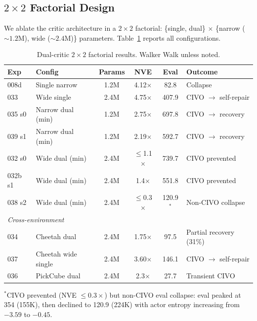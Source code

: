 \subsection{\texorpdfstring{$2{\times}2$}{2x2} Factorial Design}

We ablate the critic architecture in a $2{\times}2$ factorial: \{single, dual\} $\times$ \{narrow (${\sim}1.2$M), wide (${\sim}2.4$M)\} parameters. Table~\ref{tab:dual_critic_full} reports all configurations.

\begin{table}[ht]
\centering
\caption{Dual-critic $2{\times}2$ factorial results. Walker Walk unless noted.}
\label{tab:dual_critic_full}
\footnotesize
\setlength{\tabcolsep}{3pt}
\begin{tabular}{llcccl}
\toprule
\textbf{Exp} & \textbf{Config} & \textbf{Params} & \textbf{NVE} & \textbf{Eval} & \textbf{Outcome} \\
\midrule
008d & Single narrow & 1.2M & 4.12$\times$ & 82.8 & Collapse \\
033 & Wide single & 2.4M & 4.75$\times$ & 407.9 & CIVO $\to$ self-repair \\
035 s0 & Narrow dual (min) & 1.2M & 2.75$\times$ & 697.8 & CIVO $\to$ recovery \\
039 s1 & Narrow dual (min) & 1.2M & 2.19$\times$ & 592.7 & CIVO $\to$ recovery \\
032 s0 & Wide dual (min) & 2.4M & $\leq$1.1$\times$ & 739.7 & CIVO prevented \\
032b s1 & Wide dual (min) & 2.4M & 1.4$\times$ & 551.8 & CIVO prevented \\
038 s2 & Wide dual (min) & 2.4M & $\leq$0.3$\times$ & 120.9$^*$ & Non-CIVO collapse \\
\midrule
\multicolumn{6}{l}{\textit{Cross-environment}} \\
034 & Cheetah dual & 2.4M & 1.75$\times$ & 97.5 & Partial recovery (31\%) \\
037 & Cheetah wide single & 2.4M & 3.60$\times$ & 146.1 & CIVO $\to$ self-repair \\
036 & PickCube dual & 2.4M & 2.3$\times$ & 27.7 & Transient CIVO \\
\bottomrule
\end{tabular}
\vspace{1pt}
{\raggedright\footnotesize $^*$CIVO prevented (NVE $\leq 0.3\times$) but non-CIVO eval collapse: eval peaked at 354 (155K), then declined to 120.9 (224K) with actor entropy increasing from $-3.59$ to $-0.45$.\par}
\end{table}

